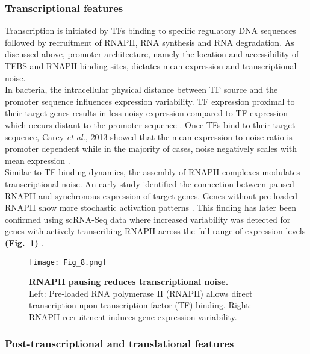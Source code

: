 \subsubsection{Transcriptional features}

Transcription is initiated by TFs binding to specific regulatory DNA sequences followed by recruitment of RNAPII, RNA synthesis and RNA degradation. As discussed above, promoter architecture, namely the location and accessibility of TFBS and RNAPII binding sites, dictates mean expression and transcriptional noise. \\

In bacteria, the intracellular physical distance between TF source and the promoter sequence influences expression variability. TF expression proximal to their target genes results in less noisy expression compared to TF expression which occurs distant to the promoter sequence \citep{Goni-Moreno2017}. Once TFs bind to their target sequence, Carey \emph{et al.}, 2013 showed that the mean expression to noise ratio is promoter dependent while in the majority of cases, noise negatively scales with mean expression \citep{Carey2013}. \\

Similar to TF binding dynamics, the assembly of RNAPII complexes modulates transcriptional noise. An early study identified the connection between paused RNAPII and synchronous expression of target genes. Genes without pre-loaded RNAPII show more stochastic activation patterns \citep{Boettiger2009}. This finding has later been confirmed using scRNA-Seq data where increased variability was detected for genes with actively transcribing RNAPII across the full range of expression levels \textbf{(Fig.~\ref{fig0:RNAPII})} \citep{Day2016}.\\

\begin{figure}[!h]
\centering
\texttt{[image: Fig\_8.png]}
\caption[RNAPII pausing reduces transcriptional noise]{\textbf{RNAPII pausing reduces transcriptional noise.}\\
Left: Pre-loaded RNA polymerase II (RNAPII) allows direct transcription upon transcription factor (TF) binding. Right: RNAPII recruitment induces gene expression variability.}
\label{fig0:RNAPII}
\end{figure} 

\newpage

\subsubsection{Post-transcriptional and translational features}

